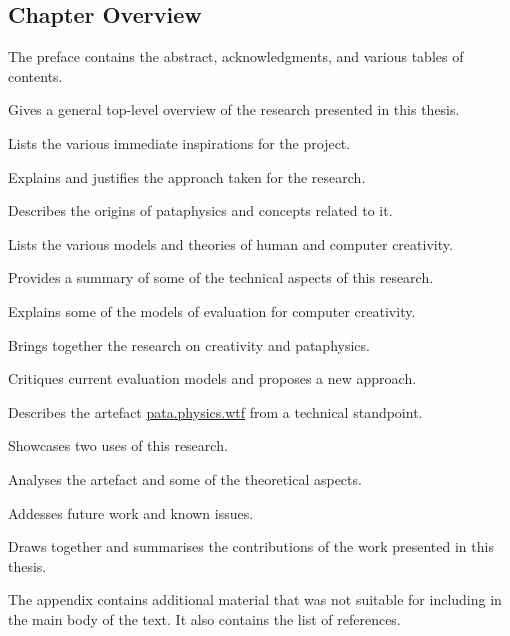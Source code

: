 \subsection{Chapter Overview}

The preface contains the abstract, acknowledgments, and various tables of contents.

\begin{description}[leftmargin=3.5cm]
  \item[Introduction] Gives a general top-level overview of the research presented in this thesis.
  \item[Inspirations] Lists the various immediate inspirations for the project.
  \item[Methodology] Explains and justifies the approach taken for the research.
  \item[Pataphysics] Describes the origins of pataphysics and concepts related to it. 
  \item[Creativity] Lists the various models and theories of human and computer creativity.
  \item[Technology] Provides a summary of some of the technical aspects of this research.
  \item[Evaluation] Explains some of the models of evaluation for computer creativity.
  \item[Foundations] Brings together the research on creativity and pataphysics.
  \item[Interpretation] Critiques current evaluation models and proposes a new approach.
  \item[Implementation] Describes the artefact \url{pata.physics.wtf} from a technical standpoint.
  \item[Applications] Showcases two uses of this research.
  \item[Patanalysis] Analyses the artefact and some of the theoretical aspects. 
  \item[Asprirations] Addesses future work and known issues.
  \item[Outroduction] Draws together and summarises the contributions of the work presented in this thesis.
\end{description}

The appendix contains additional material that was not suitable for including in the main body of the text. It also contains the list of references.


\stopcontents[chapters]
